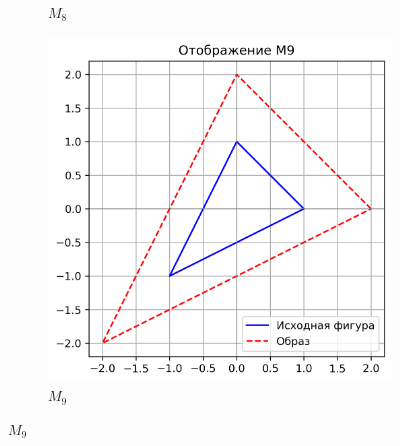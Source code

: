 \begin{figure}[H]
\begin{subfigure}[b]{0.3\textwidth}
    \caption{$M_8$}
  \end{subfigure}\hfill
  \begin{subfigure}[b]{0.3\textwidth}
    \includegraphics[width=\linewidth]{plots/M9.png}
    \caption{$M_9$}
  \end{subfigure}

  \vspace{0.5cm}


\end{figure}
